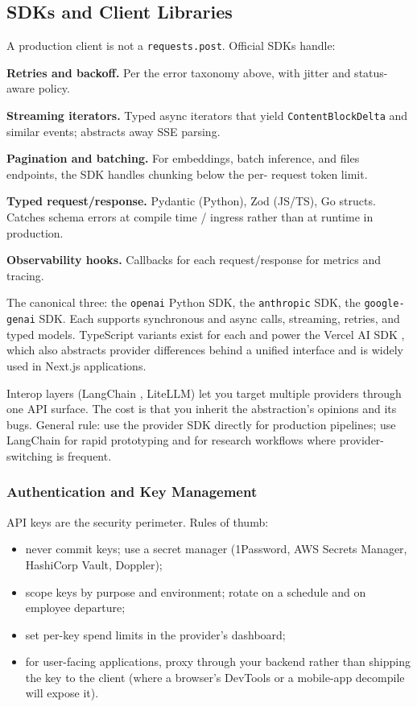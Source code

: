 \subsection{SDKs and Client Libraries}

A production client is not a \texttt{requests.post}. Official
SDKs handle:

\textbf{Retries and backoff.} Per the error taxonomy above, with
jitter and status-aware policy.

\textbf{Streaming iterators.} Typed async iterators that yield
\texttt{ContentBlockDelta} and similar events; abstracts away
SSE parsing.

\textbf{Pagination and batching.} For embeddings, batch inference,
and files endpoints, the SDK handles chunking below the per-
request token limit.

\textbf{Typed request/response.} Pydantic (Python), Zod
(JS/TS), Go structs. Catches schema errors at compile time /
ingress rather than at runtime in production.

\textbf{Observability hooks.} Callbacks for each request/response
for metrics and tracing.

The canonical three: the \texttt{openai} Python SDK, the
\texttt{anthropic} SDK, the \texttt{google-genai} SDK. Each
supports synchronous and async calls, streaming, retries, and
typed models. TypeScript variants exist for each and power the
Vercel AI SDK \citep{vercel_ai_sdk}, which also abstracts
provider differences behind a unified interface and is widely
used in Next.js applications.

Interop layers (LangChain \citep{langchain_docs}, LiteLLM) let
you target multiple providers through one API surface. The cost
is that you inherit the abstraction's opinions and its bugs.
General rule: use the provider SDK directly for production
pipelines; use LangChain for rapid prototyping and for research
workflows where provider-switching is frequent.

\subsubsection{Authentication and Key Management}

API keys are the security perimeter. Rules of thumb:
\begin{itemize}
  \item never commit keys; use a secret manager (1Password, AWS
        Secrets Manager, HashiCorp Vault, Doppler);
  \item scope keys by purpose and environment; rotate on a
        schedule and on employee departure;
  \item set per-key spend limits in the provider's dashboard;
  \item for user-facing applications, proxy through your backend
        rather than shipping the key to the client (where a
        browser's DevTools or a mobile-app decompile will expose
        it).
\end{itemize}

